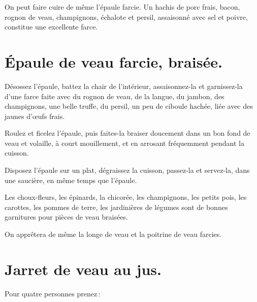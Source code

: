 \sk

On peut faire cuire de même l'épaule farcie. Un hachis de porc frais, bacon,
rognon de veau, champignons, échalote et persil, assaisonné avec sel et poivre,
constitue une excellente farce.

\section*{\centering Épaule de veau farcie, braisée.}
{}

Désossez l'épaule, battez la chair de l'intérieur, assaisonnez-la et
garnissez-la d'une farce faite avec du rognon de veau, de la langue, du jambon,
des champignons, une belle truffe, du persil, un peu de ciboule hachée, liée
avec des jaunes d'œufs frais.

Roulez et ficelez l'épaule, puis faites-la braiser doucement dans un bon fond
de veau et volaille, à court mouillement, et en arrosant fréquemment pendant la
cuisson.

Disposez l'épaule sur un plat, dégraissez la cuisson, passez-la et servez-la,
dans une saucière, en même temps que l'épaule.

Les choux-fleurs, les épinards, la chicorée, les champignons, les petits pois,
les carottes, les pommes de terre, les jardinières de légumes sont de bonnes
garnitures pour pièces de veau braisées.

\sk

On apprêtera de même la longe de veau et la poitrine de veau farcies.

\section*{\centering Jarret de veau au jus.}
{}

Pour quatre personnes prenez :

\medskip

